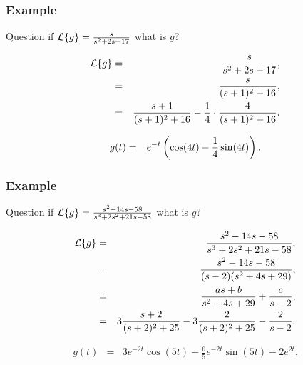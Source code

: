 \begin{frame}
  \frametitle{Example}

  \begin{block}{Question}
    if $\laplace{g}=\frac{s}{s^2+2s+17}$ what is $g$?
  \end{block}

    {
      \begin{eqnarray*}
        \laplace{g} & = & \frac{s}{s^2+2s+17}, \\
        & = & \frac{s}{(s+1)^2+16}, \\
        & = & \frac{s+1}{(s+1)^2+16} - \frac{1}{4}\cdot\frac{4}{(s+1)^2+16}.
      \end{eqnarray*}
    }

    {
      \begin{eqnarray*}
        g(t) & = & e^{-t}\left( \cos(4t) - \frac{1}{4}\sin(4t)\right).
      \end{eqnarray*}
    }
  

\end{frame}


\begin{frame}
  \frametitle{Example}

  \begin{block}{Question}
    if $\laplace{g}=\frac{s^2-14s-58}{s^3+2s^2+21s-58}$ what is $g$?
  \end{block}

    {
      \begin{eqnarray*}
        \laplace{g} & = & \frac{s^2-14s-58}{s^3+2s^2+21s-58}, \\
        & = & \frac{s^2-14s-58}{(s-2)(s^2+4s+29)}, \\
        & = & \frac{as+b}{s^2+4s+29}+\frac{c}{s-2}, \\
        & = & 3\frac{s+2}{(s+2)^2+25} - 3\frac{2}{(s+2)^2+25}-\frac{2}{s-2}.
      \end{eqnarray*}
    }

    {
      \begin{eqnarray*}
        g(t) & = & 3e^{-2t}\cos(5t) - \frac{6}{5}e^{-2t}\sin(5t)-2e^{2t}.
      \end{eqnarray*}
    }
  

\end{frame}


